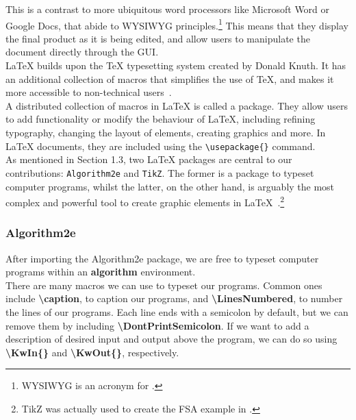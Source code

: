 This is a contrast to more ubiquitous word processors like Microsoft Word or Google Docs, that abide to WYSIWYG principles.\footnote{WYSIWYG is an acronym for .} This means that they display the final product as it is being edited, and allow users to manipulate the document directly through the GUI. \\

LaTeX builds upon the TeX typesetting system created by Donald Knuth. It has an additional collection of macros that simplifies the use of TeX, and makes it more accessible to non-technical users~\cite[7]{latex}. \\

A distributed collection of macros in LaTeX is called a package. They allow users to add functionality or modify the behaviour of LaTeX, including refining typography, changing the layout of elements, creating graphics and more. In LaTeX documents, they are included using the \texttt{\textbackslash usepackage\{\}} command. \\

As mentioned in Section 1.3, two LaTeX packages are central to  our contributions: \texttt{Algorithm2e} and \texttt{TikZ}. The former is a package to typeset computer programs, whilst the latter, on the other hand, is arguably the most complex and powerful tool to create graphic elements in LaTeX~\cite{algorithm2e, tikz}.\footnote{TikZ was actually used to create the FSA example in .}

\subsubsection{Algorithm2e}

After importing the Algorithm2e package, we are free to typeset computer programs within an \textbf{algorithm} environment. \\

There are many macros we can use to typeset our programs. Common ones include \textbf{\textbackslash caption}, to caption our programs, and \textbf{\textbackslash LinesNumbered}, to number the lines of our programs. Each line ends with a semicolon by default, but we can remove them by including \textbf{\textbackslash DontPrintSemicolon}. If we want to add a description of desired input and output above the program, we can do so using \textbf{\textbackslash KwIn\{\}} and \textbf{\textbackslash KwOut\{\}}, respectively. \\

